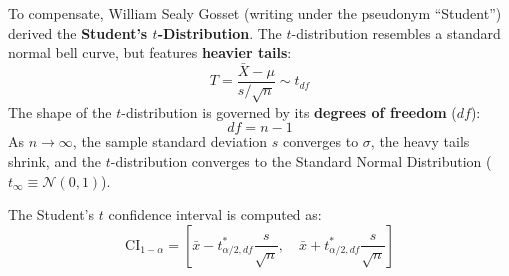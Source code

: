 To compensate, William Sealy Gosset (writing under the pseudonym ``Student'') derived the \textbf{Student's $t$-Distribution}. The $t$-distribution resembles a standard normal bell curve, but features \textbf{heavier tails}:
\begin{equation}
T = \frac{\bar{X} - \mu}{s / \sqrt{n}} \sim t_{df}\label{eq:t_stat_def}
\end{equation}
The shape of the $t$-distribution is governed by its \textbf{degrees of freedom} ($df$):
\begin{equation}
df = n - 1\label{eq:df_def}
\end{equation}
As $n \to \infty$, the sample standard deviation $s$ converges to $\sigma$, the heavy tails shrink, and the $t$-distribution converges to the Standard Normal Distribution ($t_{\infty} \equiv \mathcal{N}(0, 1)$).

The Student's $t$ confidence interval is computed as:
\begin{equation}
\text{CI}_{1-\alpha} = \left[ \bar{x} - t_{\alpha/2, df}^* \frac{s}{\sqrt{n}}, \quad \bar{x} + t_{\alpha/2, df}^* \frac{s}{\sqrt{n}} \right]\label{eq:t_interval}
\end{equation}

